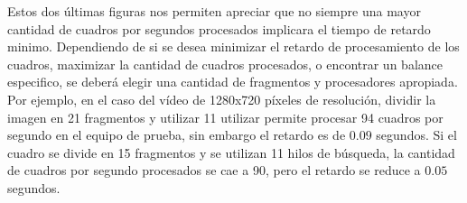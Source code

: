 Estos dos últimas figuras nos permiten apreciar que no siempre una mayor
cantidad de cuadros por segundos procesados implicara el tiempo de retardo
minimo. Dependiendo de si se desea minimizar el retardo de procesamiento de los
cuadros, maximizar la cantidad de cuadros procesados, o encontrar un balance
especifico, se deberá elegir una cantidad de fragmentos y procesadores
apropiada. Por ejemplo, en el caso del vídeo de 1280x720 píxeles de resolución,
dividir la imagen en 21 fragmentos y utilizar 11 utilizar permite procesar 94
cuadros por segundo en el equipo de prueba, sin embargo el retardo es de $0.09$
segundos. Si el cuadro se divide en 15 fragmentos y se utilizan 11 hilos de
búsqueda, la cantidad de cuadros por segundo procesados se cae a 90, pero el
retardo se reduce a $0.05$ segundos.
